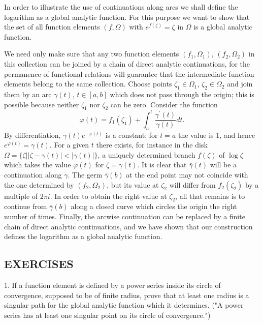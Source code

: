In order to illustrate the use of continuations along arcs we shall define the logarithm as a global analytic function. For this purpose we want to show that the set of all function elements $(f,\Omega)$ with $e^{f(\zeta)} = \zeta$ in $\Omega$ is a global analytic function.

We need only make sure that any two function elements $(f_{1},\Omega_{1})$, $(f_{2},\Omega_{2})$ in this collection can be joined by a chain of direct analytic continuations, for the permanence of functional relations will guarantee that the intermediate function elements belong to the same collection. Choose points $\zeta_{1}\in\Omega_{1}$, $\zeta_{2}\in\Omega_{2}$ and join them by an arc $\gamma(t)$, $t\in[a,b]$ which does not pass through the origin; this is possible because neither $\zeta_{1}$ nor $\zeta_{2}$ can be zero. Consider the function
\begin{equation*}
\varphi (t) = f _ {1} (\zeta_ {1}) + \int_ {a} ^ {t} \frac {\gamma^ {\prime} (t)}{\gamma (t)} d t.
\end{equation*}
By differentiation, $\gamma(t)e^{-\varphi(t)}$ is a constant; for $t = a$ the value is 1, and hence $e^{\varphi(t)} = \gamma(t)$. For a given $t$ there exists, for instance in the disk $\Omega = \{\zeta | |\zeta - \gamma(t)| < |\gamma(t)|\}$, a uniquely determined branch $f(\zeta)$ of $\log \zeta$ which takes the value $\varphi(t)$ for $\zeta = \gamma(t)$. It is clear that $\bar{\gamma}(t)$ will be a continuation along $\gamma$. The germ $\bar{\gamma}(b)$ at the end point may not coincide with the one determined by $(f_2, \Omega_2)$, but its value at $\zeta_2$ will differ from $f_2(\zeta_2)$ by a multiple of $2\pi i$. In order to obtain the right value at $\zeta_2$, all that remains is to continue from $\bar{\gamma}(b)$ along a closed curve which circles the origin the right number of times. Finally, the arcwise continuation can be replaced by a finite chain of direct analytic continuations, and we have shown that our construction defines the logarithm as a global analytic function.

\subsection*{EXERCISES}
1. If a function element is defined by a power series inside its circle of convergence, supposed to be of finite radius, prove that at least one radius is a singular path for the global analytic function which it determines. ("A power series has at least one singular point on its circle of convergence.")


